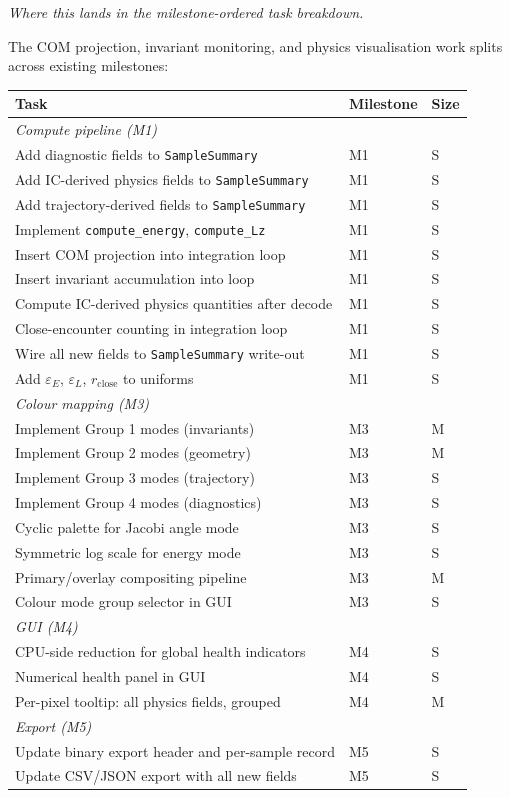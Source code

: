 \documentclass[11pt]{article}
\newcommand{\struct}[1]{\texttt{#1}}
\begin{document}
\textit{Where this lands in the milestone-ordered task breakdown.}

The COM projection, invariant monitoring, and physics visualisation work splits
across existing milestones:

\begin{center}
\begin{tabular}{lll}
\toprule
Task & Milestone & Size \\
\midrule
\multicolumn{3}{l}{\textit{Compute pipeline (M1)}} \\
Add diagnostic fields to \struct{SampleSummary} & M1 & S \\
Add IC-derived physics fields to \struct{SampleSummary} & M1 & S \\
Add trajectory-derived fields to \struct{SampleSummary} & M1 & S \\
Implement \texttt{compute\_energy}, \texttt{compute\_Lz} & M1 & S \\
Insert COM projection into integration loop & M1 & S \\
Insert invariant accumulation into loop & M1 & S \\
Compute IC-derived physics quantities after decode & M1 & S \\
Close-encounter counting in integration loop & M1 & S \\
Wire all new fields to \struct{SampleSummary} write-out & M1 & S \\
Add $\varepsilon_E$, $\varepsilon_L$, $r_{\text{close}}$ to uniforms & M1 & S \\
\midrule
\multicolumn{3}{l}{\textit{Colour mapping (M3)}} \\
Implement Group 1 modes (invariants) & M3 & M \\
Implement Group 2 modes (geometry) & M3 & M \\
Implement Group 3 modes (trajectory) & M3 & S \\
Implement Group 4 modes (diagnostics) & M3 & S \\
Cyclic palette for Jacobi angle mode & M3 & S \\
Symmetric log scale for energy mode & M3 & S \\
Primary/overlay compositing pipeline & M3 & M \\
Colour mode group selector in GUI & M3 & S \\
\midrule
\multicolumn{3}{l}{\textit{GUI (M4)}} \\
CPU-side reduction for global health indicators & M4 & S \\
Numerical health panel in GUI & M4 & S \\
Per-pixel tooltip: all physics fields, grouped & M4 & M \\
\midrule
\multicolumn{3}{l}{\textit{Export (M5)}} \\
Update binary export header and per-sample record & M5 & S \\
Update CSV/JSON export with all new fields & M5 & S \\
\bottomrule
\end{tabular}
\end{center}
\end{document}
